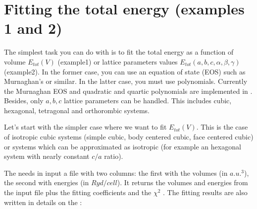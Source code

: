 \documentclass[letterpaper,10pt,english]{sphinxmanual}
\begin{document}
\section{Fitting the total energy (examples 1 and 2)}
\label{tutorial:fitting-the-total-energy-examples-1-and-2}
The simplest task you can do with  is to fit the total energy as a function of volume \(E_{tot}(V)\) (example1) or lattice parameters values \(E_{tot}(a,b,c,\alpha,\beta,\gamma)\) (example2). In the former case, you can use
an equation of state (EOS) such as Murnaghan's or similar. In the latter case, you must use polynomials. Currently the Murnaghan EOS and quadratic and quartic polynomials are implemented in . Besides, only \(a,b,c\) lattice parameters can be handled. This includes cubic, hexagonal, tetragonal and orthorombic systems.

Let's start with the simpler case where we want to fit \(E_{tot}(V)\). This is the case of isotropic cubic systems (simple cubic, body centered cubic, face centered cubic) or systems which can be approximated as isotropic (for example an hexagonal system with nearly constant \(c/a\) ratio).

\begin{sphinxVerbatim}[commandchars=\\\{\}]

    

    		
         	

                    	

\end{sphinxVerbatim}

The  needs in input a file with two columns: the first with the volumes (in \(a.u.^3\)), the second with energies (in \(Ryd/cell\)). It returns the volumes  and energies  from the input file plus the fitting coefficients  and the \(\chi^2\) . The fitting results are also written in details on the :
\end{document}
